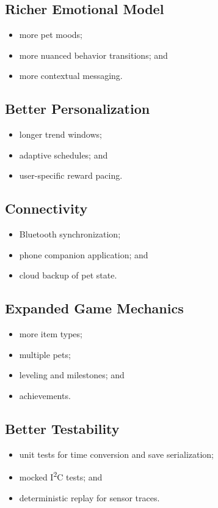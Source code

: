 \documentclass[conference]{IEEEtran}
\begin{document}
\subsection{Richer Emotional Model}
\begin{itemize}
\item more pet moods;
\item more nuanced behavior transitions; and
\item more contextual messaging.
\end{itemize}

\subsection{Better Personalization}
\begin{itemize}
\item longer trend windows;
\item adaptive schedules; and
\item user-specific reward pacing.
\end{itemize}

\subsection{Connectivity}
\begin{itemize}
\item Bluetooth synchronization;
\item phone companion application; and
\item cloud backup of pet state.
\end{itemize}

\subsection{Expanded Game Mechanics}
\begin{itemize}
\item more item types;
\item multiple pets;
\item leveling and milestones; and
\item achievements.
\end{itemize}

\subsection{Better Testability}
\begin{itemize}
\item unit tests for time conversion and save serialization;
\item mocked I\textsuperscript{2}C tests; and
\item deterministic replay for sensor traces.
\end{itemize}
\end{document}

